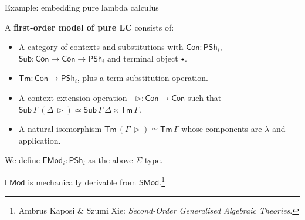 \documentclass[dvipsnames,aspectratio=169]{beamer}
\newcommand{\Con}{\mathsf{Con}}
\newcommand{\Sub}{\mathsf{Sub}}
\newcommand{\Tm}{\mathsf{Tm}}
\newcommand{\blank}{\mathord{\hspace{1pt}\text{--}\hspace{1pt}}}
\newcommand{\Set}{\mathsf{Set}}
\newcommand{\Base}{\mathsf{Base}}
\newcommand{\In}{\mathsf{In}}
\newcommand{\PSh}{\mathsf{PSh}}
\newcommand{\Cat}{\mathsf{Cat}}
\newcommand{\base}{\mathsf{base}}
\newcommand{\SMod}{\mathsf{SMod}}
\newcommand{\FMod}{\mathsf{FMod}}
\newcommand{\ext}{\triangleright}
\newcommand{\emptycon}{\scaleobj{.75}\bullet}
\begin{document}
\begin{frame}{Example: embedding pure lambda calculus}

A \textbf{first-order model of pure LC} consists of:
\begin{itemize}
\item A category of contexts and substitutions with $\Con : \PSh_i$, $\Sub : \Con \to \Con \to \PSh_i$ and terminal
      object $\emptycon$.
\item $\Tm : \Con \to \PSh_i$, plus a term substitution operation.
\item A context extension operation $\blank\ext : \Con \to \Con$ such that $\Sub\,\Gamma\,(\Delta\,\ext) \simeq \Sub\,\Gamma\,\Delta \times \Tm\,\Gamma$.
\item A natural isomorphism $\Tm\,(\Gamma\,\ext) \simeq \Tm\,\Gamma$ whose components are $\lambda$ and application.
\end{itemize}
\vspace{1em}
We define $\FMod_i : \PSh_i$ as the above $\Sigma$-type.

\vspace{1em}
$\FMod$ is mechanically derivable from $\SMod$.\footnote{Ambrus Kaposi \& Szumi Xie: \emph{Second-Order Generalised Algebraic Theories}.}

\end{frame}
\end{document}
